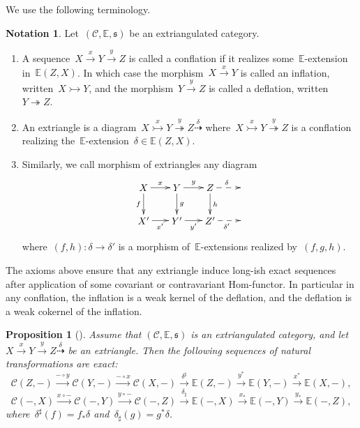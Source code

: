 \documentclass{amsart}
\newtheorem{proposition}[theorem]{Proposition}
\theoremstyle{definition}
\newtheorem{notation}[theorem]{Notation}
\newcommand{\cat}{\mathcal{C}}
\newcommand{\infl}{\rightarrowtail}
\newcommand{\defl}{\twoheadrightarrow}
\begin{document}
\enlargethispage{-.8cm}
We use the following terminology.

\begin{notation}
Let~$(\cat,\mathbb{E},\mathfrak{s})$ be an extriangulated category.
\begin{enumerate}
\item A sequence~$X\xrightarrow{x}Y\xrightarrow{y}Z$ is called a conflation if it realizes some~$\mathbb{E}$-extension in~$\mathbb{E}(Z,X)$. In which case the morphism~$X\xrightarrow{x}Y$ is called an inflation, written~$X\infl Y$, and the morphism~$Y\xrightarrow{y}Z$ is called a deflation, written~$Y\defl Z$.
\item An extriangle is a diagram~$X\overset{x}{\infl} Y\overset{y}{\defl} Z\overset{\delta}{\dashrightarrow}$ where~$X\overset{x}{\infl} Y\overset{y}{\defl} Z$ is a conflation realizing the~$\mathbb{E}$-extension~$\delta\in\mathbb{E}(Z,X)$.
\item Similarly, we call morphism of extriangles any diagram
\[
\xy
(-12,6)*+{X}="0";
(0,6)*+{Y}="2";
(12,6)*+{Z}="4";
(24,6)*+{}="6";
%
(-12,-6)*+{X'}="10";
(0,-6)*+{Y'}="12";
(12,-6)*+{Z'}="14";
(24,-6)*+{}="16";
%
{\ar^{x} "0";"2"};
{\ar^{y} "2";"4"};
{\ar@{-->}^{\delta} "4";"6"};
%
{\ar_{f} "0";"10"};
{\ar^{g} "2";"12"};
{\ar^{h} "4";"14"};
%
{\ar_{x'} "10";"12"};
{\ar_{y'} "12";"14"};
{\ar@{-->}_{\delta'} "14";"16"};
%
{\ar@{}|{} "0";"12"};
{\ar@{}|{} "2";"14"};
\endxy
\]
where~$(f,h):\delta\to\delta'$ is a morphism of~$\mathbb{E}$-extensions realized by~$(f,g,h)$.
\end{enumerate}
\end{notation}

The axioms above ensure that any extriangle induce long-ish exact sequences after application of some covariant or contravariant Hom-functor.
In particular in any conflation, the inflation is a weak kernel of the deflation, and the deflation is a weak cokernel of the inflation.

\begin{proposition}[{\cite[Props.~3.3~\&~3.11]{NakaokaPalu}}]
\label{prop:extricat long exact sequences}
Assume that $(\cat,\mathbb{E},\mathfrak{s})$ is an extriangulated category, and let $X\xrightarrow{x}Y\xrightarrow{y}Z\overset{\delta}{\dashrightarrow}$ be an extriangle.
Then the following sequences of natural transformations are exact:
\[
\cat(Z,-)\overset{-\circ y}{\longrightarrow}\cat(Y,-)\overset{-\circ x}{\longrightarrow}\cat(X,-)\overset{\delta^\sharp}{\longrightarrow}\mathbb{E}(Z,-)\overset{y^\ast}{\longrightarrow}\mathbb{E}(Y,-)\overset{x^\ast}{\longrightarrow}\mathbb{E}(X,-),
\]
\[
\cat(-,X)\overset{x\circ-}{\longrightarrow}\cat(-,Y)\overset{y\circ-}{\longrightarrow}\cat(-,Z)\overset{\delta_\sharp}{\longrightarrow}\mathbb{E}(-,X)\overset{x_\ast}{\longrightarrow}\mathbb{E}(-,Y)\overset{y_\ast}{\longrightarrow}\mathbb{E}(-,Z),
\]
where~$\delta^\sharp(f)=f_\ast\delta$ and~$\delta_\sharp(g)=g^\ast\delta$.
\end{proposition}
\end{document}
